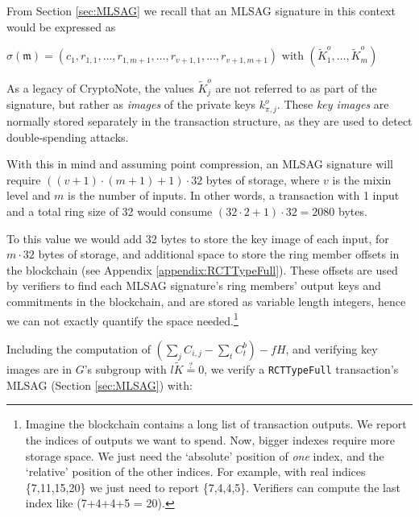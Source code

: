 From Section \ref{sec:MLSAG} we recall that an MLSAG signature in this context would be expressed as

\hfill \(\sigma(\mathfrak{m}) = (c_1, r_{1, 1}, ..., r_{1, m+1}, ..., r_{v+1, 1}, ..., r_{v+1, m+1}) \textrm{ with } (\tilde{K}^o_1, ..., \tilde{K}^o_m) \) \hfill \phantom{.}

As a legacy of CryptoNote, the values \(\tilde{K}^o_j\) are not referred to as part of the signature, but rather as {\em images} of the private keys $k^o_{\pi,j}$. These {\em key images} are normally stored separately in the transaction structure, as they are used to detect double-spending attacks.

With this in mind and assuming point compression, an MLSAG signature will require $((v + 1) \cdot (m + 1) + 1) \cdot 32$ bytes of storage, where $v$ is the mixin level and $m$ is the number of inputs. In other words, a transaction with 1 input and a total ring size of 32 would consume $(32 \cdot 2 + 1) \cdot 32 = 2080$ bytes.

To this value we would add 32 bytes to store the key image of each input, for $m \cdot 32$ bytes of storage, and additional space to store the ring member offsets in the blockchain (see Appendix \ref{appendix:RCTTypeFull}). These offsets are used by verifiers to find each MLSAG signature's ring members' output keys and commitments in the blockchain, and are stored as variable length integers, hence we can not exactly quantify the space needed.\footnote{Imagine the blockchain contains a long list of transaction outputs. We report the indices of outputs we want to spend. Now, bigger indexes require more storage space. We just need the `absolute' position of {\em one} index, and the `relative' position of the other indices. For example, with real indices \{7,11,15,20\} we just need to report \{7,4,4,5\}. Verifiers can compute the last index like (7+4+4+5 = 20).}%

Including the computation of \((\sum\limits_j C_{i, j} - \sum\limits_t C^b_{t}) - f H\), and verifying key images are in $G$'s subgroup with $l \tilde{K} \stackrel{?}{=} 0$, we verify a {\tt RCTTypeFull} transaction's MLSAG (Section \ref{sec:MLSAG}) with:

